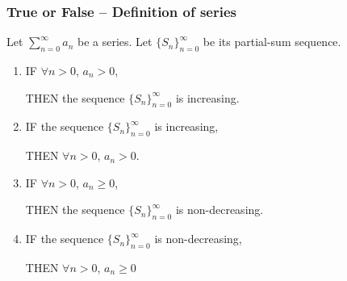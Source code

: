 \documentclass[14pt]{beamer}
\begin{document}
\begin{frame}[t]
	\fontsize{12}{12}\selectfont
	\frametitle{True or False -- Definition of series}

	Let $\displaystyle \sum_{n=0}^{\infty}a_{n}$ be a series. Let
	$\displaystyle \{ S_{n}\}_{n=0}^{\infty}$ be its partial-sum sequence.

	\begin{enumerate}
		\addtocounter{enumi}{3}

		\item IF {\color{blue} $\displaystyle \forall n >0$, $\displaystyle a_{n}>0$},
			\vspace{.2cm}

			THEN {\color{red} the sequence $\displaystyle \{ S_{n}\}_{n=0}^{\infty}$ is increasing}.
			\vspace{.5cm}

		\item IF {\color{red} the sequence $\displaystyle \{ S_{n}\}_{n=0}^{\infty}$ is increasing},
			\\
			\vspace{.2cm}

			THEN {\color{blue} $\displaystyle \forall n >0$, $\displaystyle a_{n}>0$}.
			\vspace{.5cm}

		\item IF {\color{blue} $\displaystyle \forall n >0$, $\displaystyle a_{n}\geq0$},
			\vspace{.2cm}

			THEN {\color{red} the sequence $\displaystyle \{ S_{n}\}_{n=0}^{\infty}$ is non-decreasing}.

			\vspace{.5cm}

		\item IF {\color{red} the sequence $\displaystyle \{ S_{n}\}_{n=0}^{\infty}$ is non-decreasing},
			\\
			\vspace{.2cm}

			THEN {\color{blue} $\displaystyle \forall n >0$, $\displaystyle a_{n}\geq0$}
	\end{enumerate}
\end{frame}
\end{document}
